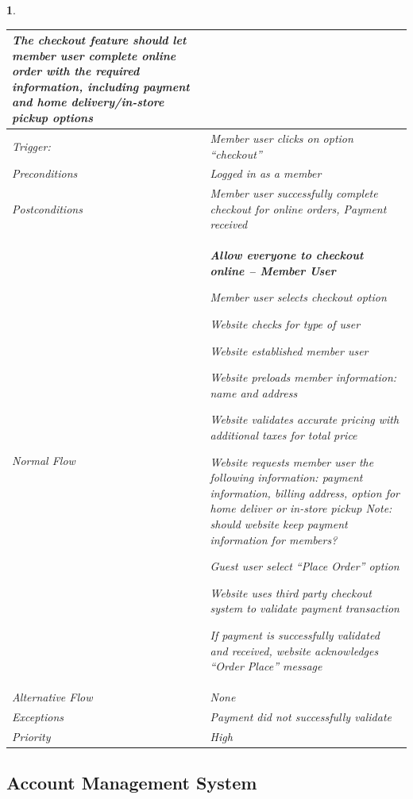 \documentclass{scrreprt}
\theoremstyle{funreq}
\newtheorem{funreq}{}
\begin{document}
\begin{funreq}
\begin{table}[H]
{\begin{tabularx}{\columnwidth}{|l|X|}
					The checkout feature should let member user complete online order with the required information, including payment and home delivery/in-store pickup options
					\\ \hline
					Trigger:         & Member user clicks on option “checkout”                    \\ \hline
					Preconditions    & Logged in as a member                                       \\ \hline
					Postconditions   & Member user successfully complete checkout for online orders, Payment received\\ \hline
					Normal Flow &
					\bfseries{Allow everyone to checkout online – Member User}\normalfont\newline 
					
					Member user selects checkout option
					
					Website checks for type of user
					
					Website established member user
					
					Website preloads member information: name and address
					
					Website validates accurate pricing with additional taxes for total price
					
					Website requests member user the following information: payment information, billing address, option for home deliver or in-store pickup \textit{Note: should website keep payment information for member}s?
					
					Guest user select “Place Order” option
					
					Website uses third party checkout system to validate payment transaction
					
					If payment is successfully validated and received, website acknowledges “Order Place” message\\ \hline
					
					Alternative Flow & None                                       \\ \hline
					Exceptions       & Payment did not successfully validate \\ \hline
					Priority & High                                       \\ \hline
				\end{tabularx}%
			}
		\end{table}
	\end{funreq}

	\subsection{Account Management System}
\end{document}
